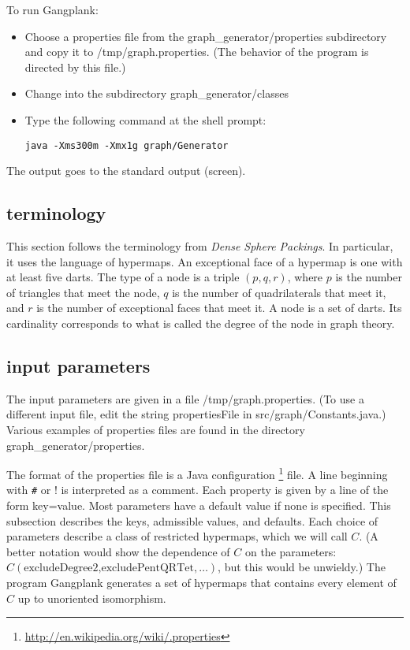 To run Gangplank:

\begin{itemize}
\item Choose a properties file from the graph\_generator/properties subdirectory and copy it to /tmp/graph.properties.  (The behavior of the program is directed by this file.)
\item Change into the subdirectory graph\_generator/classes
\item Type the following command at the shell prompt:
\begin{verbatim}
java -Xms300m -Xmx1g graph/Generator  
\end{verbatim}
\end{itemize}

The output goes to the standard output (screen).

\subsection{terminology}

This section follows the terminology from {\it Dense Sphere Packings}.  In particular,
it uses the language of hypermaps.  An exceptional face of a hypermap is one with
at least five darts.  The type of a node is a triple $(p,q,r)$,
where $p$ is the number of triangles that meet the node, $q$ is the number of quadrilaterals that meet it, and $r$ is the number of exceptional faces that meet it.
A node is a set of darts. Its cardinality corresponds to what is called the degree of the
node in graph theory.

\subsection{input parameters}

The input parameters are given in a file /tmp/graph.properties.
(To use a different input file, edit the string propertiesFile
in src/graph/Constants.java.)  Various examples of properties files
are found in the directory graph\_generator/properties.

The format of the properties file is a Java configuration%
\footnote{\url{http://en.wikipedia.org/wiki/.properties}} %
file.  A line beginning with \verb!#! or ! is interpreted as a comment.
Each property is given by a line of the form key=value.
Most parameters have a default value if none is specified.
This subsection describes the keys, admissible values, and defaults.
Each choice of parameters describe a class of restricted hypermaps, which we will call $C$.
(A better notation would show the dependence of $C$ on the parameters:
$C(\text{excludeDegree2,excludePentQRTet},\ldots)$, but this would be unwieldy.)
The program Gangplank generates a set of hypermaps that contains every element of
$C$ up to unoriented isomorphism.


